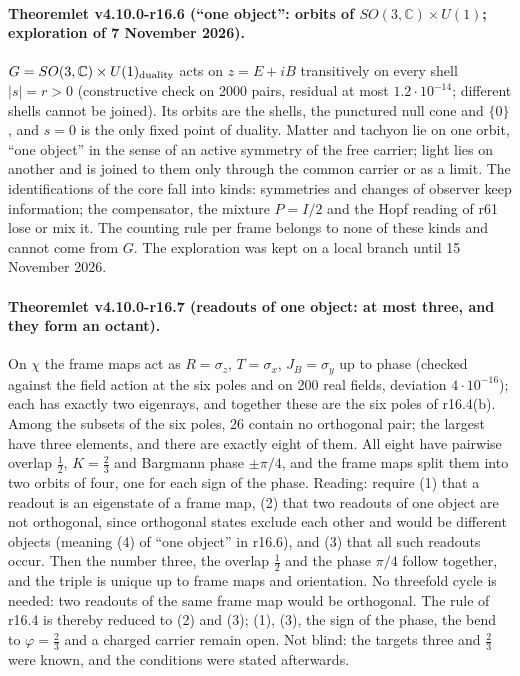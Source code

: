 \paragraph{Theoremlet v4.10.0-r16.6 (``one object'': orbits of \(SO(3,\mathbb C)\times U(1)\); exploration of 7 November 2026).}
\(G=SO(3,\mathbb C)\times U(1)_{\rm duality}\) acts on \(z=E+iB\) transitively on every shell \(|s|=r>0\) (constructive check on 2000
pairs, residual at most \(1.2\cdot10^{-14}\); different shells cannot be joined).  Its orbits are the shells, the punctured null
cone and \(\{0\}\), and \(s=0\) is the only fixed point of duality.  Matter and tachyon lie on one orbit, ``one object'' in the sense
of an active symmetry of the free carrier; light lies on another and is joined to them only through the common carrier or as
a limit.  The identifications of the core fall into kinds: symmetries and changes of observer keep information; the
compensator, the mixture \(P=I/2\) and the Hopf reading of r61 lose or mix it.  The counting rule per frame belongs to none of
these kinds and cannot come from \(G\).  The exploration was kept on a local branch until 15 November 2026.

\paragraph{Theoremlet v4.10.0-r16.7 (readouts of one object: at most three, and they form an octant).}
On \(\chi\) the frame maps act as \(R=\sigma_z\), \(T=\sigma_x\), \(J_B=\sigma_y\) up to phase (checked against the field action at the six
poles and on 200 real fields, deviation \(4\cdot10^{-16}\)); each has exactly two eigenrays, and together these are the six poles of
r16.4(b).  Among the subsets of the six poles, 26 contain no orthogonal pair; the largest have three elements, and there are
exactly eight of them.  All eight have pairwise overlap \(\tfrac12\), \(K=\tfrac23\) and Bargmann phase \(\pm\pi/4\), and the frame maps
split them into two orbits of four, one for each sign of the phase.
Reading: require (1) that a readout is an eigenstate of a frame map, (2) that two readouts of one object are not orthogonal,
since orthogonal states exclude each other and would be different objects (meaning (4) of ``one object'' in r16.6), and (3) that
all such readouts occur.  Then the number three, the overlap \(\tfrac12\) and the phase \(\pi/4\) follow together, and the triple is
unique up to frame maps and orientation.  No threefold cycle is needed: two readouts of the same frame map would be
orthogonal.  The rule of r16.4 is thereby reduced to (2) and (3); (1), (3), the sign of the phase, the bend to \(\varphi=\tfrac23\) and a
charged carrier remain open.  Not blind: the targets three and \(\tfrac23\) were known, and the conditions were stated afterwards.

